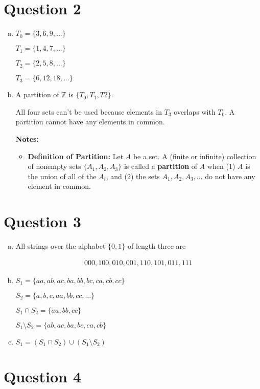 \documentclass[12pt]{article}
\begin{document}
\section*{Question 2}
\begin{enumerate}[a.]
    \item

    $T_0 = \{3,6,9,\dots\}$

    $T_1 = \{1,4,7,\dots\}$

    $T_2 = \{2,5,8,\dots\}$

    $T_3 = \{6,12,18,\dots\}$

    \item

    A partition of $\mathbb{Z}$ is $\{T_0,T_1,T2\}$.

    \bigskip

    All four sets can't be used because elements in $T_3$ overlaps with $T_0$.
    A partition cannot have any elements in common.

    \bigskip

    \textbf{Notes:}

    \begin{itemize}
        \item \textbf{Definition of Partition:} Let $A$ be a set. A (finite or
        infinite) collection of nonempty sets $\{A_1,A_2,A_3\}$ is called a
        \textbf{partition} of $A$ when (1) $A$ is the union of all of the $A_i$,
        and (2) the sets $A_1,A_2,A_3,\dots$ do not have any element in common.

    \end{itemize}

\end{enumerate}


\section*{Question 3}
\begin{enumerate}[a.]
    \item

    All strings over the alphabet $\{0,1\}$ of length three are

    \begin{align*}
        000,100,010,001,110,101,011,111
    \end{align*}

    \item

    $S_1 = \{aa,ab,ac,ba,bb,bc,ca,cb,cc\}$

    $S_2 = \{a,b,c,aa,bb,cc,\dots\}$

    $S_1 \cap S_2 = \{aa,bb,cc\}$

    $S_1 \setminus S_2 = \{ab,ac,ba,bc,ca,cb\}$

    \item

    $S_1 = (S_1 \cap S_2) \cup (S_1 \setminus S_2)$
\end{enumerate}

\section*{Question 4}
\end{document}
